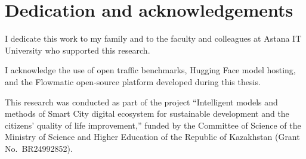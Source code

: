 %
%
\chapter{Dedication and acknowledgements}
\begin{SingleSpace}
I dedicate this work to my family and to the faculty and colleagues at Astana IT University who supported this research.

I acknowledge the use of open traffic benchmarks, Hugging Face model hosting, and the Flowmatic open-source platform developed during this thesis.

This research was conducted as part of the project ``Intelligent models and methods of Smart City digital ecosystem for sustainable development and the citizens' quality of life improvement,'' funded by the Committee of Science of the Ministry of Science and Higher Education of the Republic of Kazakhstan (Grant No.\ BR24992852).
\end{SingleSpace}
\clearpage
